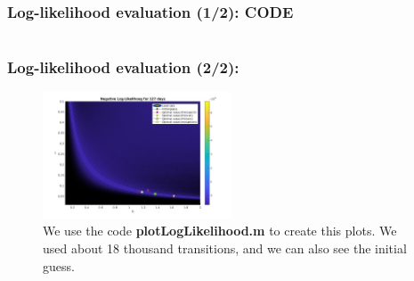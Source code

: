 \documentclass[aspectratio=169]{beamer}\usepackage[utf8]{inputenc}
\begin{document}

\begin{frame}\frametitle{Log-likelihood evaluation (1/2): CODE}

\begin{center}
\begin{tabular}{|c|}
\toprule
{\tiny

}\\
\bottomrule
\end{tabular}
\end{center}

\end{frame}


\begin{frame}\frametitle{Log-likelihood evaluation (2/2):}

\begin{figure}[ht!]
\centering
\includegraphics[width=0.5\textwidth]{../Results/likelihood/normal/Log-Likelihood.jpg}
\caption{We use the code \textbf{plotLogLikelihood.m} to create this plots. We used about 18 thousand transitions, and we can also see the initial guess.}
\end{figure}

\end{frame}

\end{document}

